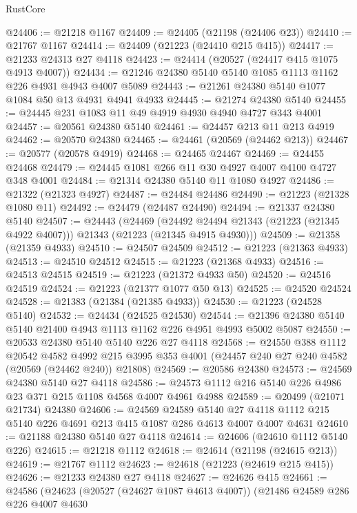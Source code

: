 \begin{lexlean}{RustCore}
\begin{coremodule}
@24406 := @21218 @1167
@24409 := @24405 (@21198 (@24406 @23))
@24410 := @21767 @1167
@24414 := @24409 (@21223 (@24410 @215 @415))
@24417 := @21233 @24313 @27 @4118
@24423 := @24414 (@20527 (@24417 @415 @1075 @4913 @4007))
@24434 := @21246 @24380 @5140 @5140 @1085 @1113 @1162 @226 @4931 @4943 @4007 @5089
@24443 := @21261 @24380 @5140 @1077 @1084 @50 @13 @4931 @4941 @4933
@24445 := @21274 @24380 @5140
@24455 := @24445 @231 @1083 @11 @49 @4919 @4930 @4940 @4727 @343 @4001
@24457 := @20561 @24380 @5140
@24461 := @24457 @213 @11 @213 @4919
@24462 := @20570 @24380
@24465 := @24461 (@20569 (@24462 @213))
@24467 := @20577 (@20578 @4919)
@24468 := @24465 @24467
@24469 := @24455 @24468
@24479 := @24445 @1081 @266 @11 @30 @4927 @4007 @4100 @4727 @348 @4001
@24484 := @21314 @24380 @5140 @11 @1080 @4927
@24486 := @21322 (@21323 @4927)
@24487 := @24484 @24486
@24490 := @21223 (@21328 @1080 @11)
@24492 := @24479 (@24487 @24490)
@24494 := @21337 @24380 @5140
@24507 := @24443
    (@24469
      (@24492 @24494 @21343 (@21223 (@21345 @4922 @4007)))
      @21343
      (@21223 (@21345 @4915 @4930)))
@24509 := @21358 (@21359 @4933)
@24510 := @24507 @24509
@24512 := @21223 (@21363 @4933)
@24513 := @24510 @24512
@24515 := @21223 (@21368 @4933)
@24516 := @24513 @24515
@24519 := @21223 (@21372 @4933 @50)
@24520 := @24516 @24519
@24524 := @21223 (@21377 @1077 @50 @13)
@24525 := @24520 @24524
@24528 := @21383 (@21384 (@21385 @4933))
@24530 := @21223 (@24528 @5140)
@24532 := @24434 (@24525 @24530)
@24544 := @21396 @24380 @5140 @5140 @21400 @4943 @1113 @1162 @226 @4951 @4993 @5002 @5087
@24550 := @20533 @24380 @5140 @5140 @226 @27 @4118
@24568 := @24550
    @388
    @1112
    @20542
    @4582
    @4992
    @215
    @3995
    @353
    @4001
    (@24457 @240 @27 @240 @4582 (@20569 (@24462 @240)) @21808)
@24569 := @20586 @24380
@24573 := @24569 @24380 @5140 @27 @4118
@24586 := @24573 @1112 @216 @5140 @226 @4986 @23 @371 @215 @1108 @4568 @4007 @4961 @4988
@24589 := @20499 (@21071 @21734) @24380
@24606 := @24569
    @24589
    @5140
    @27
    @4118
    @1112
    @215
    @5140
    @226
    @4691
    @213
    @415
    @1087
    @286
    @4613
    @4007
    @4007
    @4631
@24610 := @21188 @24380 @5140 @27 @4118
@24614 := @24606 (@24610 @1112 @5140 @226)
@24615 := @21218 @1112
@24618 := @24614 (@21198 (@24615 @213))
@24619 := @21767 @1112
@24623 := @24618 (@21223 (@24619 @215 @415))
@24626 := @21233 @24380 @27 @4118
@24627 := @24626 @415
@24661 := @24586
    (@24623
      (@20527 (@24627 @1087 @4613 @4007))
      (@21486
        @24589
        @286
        @226
        @4007
        @4630

\end{coremodule}
\end{lexlean}
